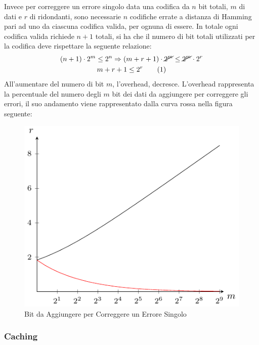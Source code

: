 \documentclass{article}
\numberwithin{equation}{subsection}
\newcommand{\tageq}{\tag{\stepcounter{equation}\theequation}}
\begin{document}
Invece per correggere un errore singolo data una codifica da $n$ bit totali, $m$ di dati e $r$ di ridondanti, sono necessarie $n$ codifiche errate a distanza di Hamming pari ad uno da ciascuna codifica valida, 
per ognuna di essere. In totale ogni codifica valida richiede $n+1$ totali, si ha che il numero di bit totali utilizzati per la codifica deve rispettare la seguente relazione:
\begin{gather*}
    (n+1)\cdot2^m\leq2^n\Rightarrow(m+r+1)\cdot\cancel{2^m}\leq\cancel{2^m}\cdot2^r\\
    m+r+1\leq2^r\tageq
\end{gather*}  
All'aumentare del numero di bit $m$, l'overhead, decresce. L'overhead rappresenta la percentuale del numero degli $m$ bit dei dati da aggiungere per correggere gli errori, il suo andamento 
viene rappresentato dalla curva rossa nella figura seguente:
\begin{figure}[H]%
    \centering%
    \includegraphics{overhead.pdf}%
    \caption{Bit da Aggiungere per Correggere un Errore Singolo}
\end{figure}

\subsubsection{Caching}
\end{document}
